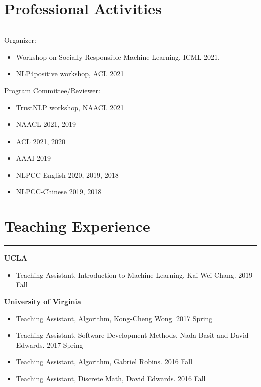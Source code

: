\documentclass[11pt, a4paper]{article}
\newcommand{\hr}{\hrule\vspace{0.5em}}
\begin{document}
\section*{Professional Activities}
\hr
Organizer:
\begin{itemize}
\item Workshop on Socially Responsible Machine Learning, ICML 2021.
\item NLP4positive workshop, ACL 2021
\end{itemize}
Program Committee/Reviewer:
\begin{itemize}
\item TrustNLP workshop, NAACL 2021
\item NAACL 2021, 2019
\item ACL 2021, 2020
\item AAAI 2019
\item NLPCC-English 2020, 2019, 2018
\item NLPCC-Chinese 2019, 2018
\end{itemize}

\section*{Teaching Experience}
\hr
\textbf{UCLA}
\begin{itemize}
	\item Teaching Assistant, Introduction to Machine Learning, Kai-Wei Chang. 2019 Fall
\end{itemize}
\textbf{University of Virginia}
\begin{itemize}
\item Teaching Assistant, Algorithm, Kong-Cheng Wong. 2017 Spring
\item Teaching Assistant, Software Development Methods, Nada Basit and David Edwards. 2017 Spring
\item Teaching Assistant, Algorithm, Gabriel Robins. 2016 Fall
\item Teaching Assistant, Discrete Math, David Edwards. 2016 Fall
\end{itemize}

\end{document}

